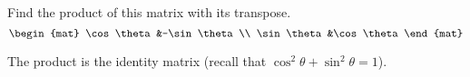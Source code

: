 
\begin{Exercise}[
name={},
title={}, 
difficulty=0,
origin={\cite{JH}}]
Find the product of this matrix with its transpose.
\begin{equation*}
\begin{mat}
\cos\theta  &-\sin\theta  \\
\sin\theta  &\cos\theta
\end{mat}
\end{equation*}
\end{Exercise}

\begin{Answer}
The product is the identity matrix (recall that
$\cos^2\theta+\sin^2\theta =1$).
\end{Answer}
